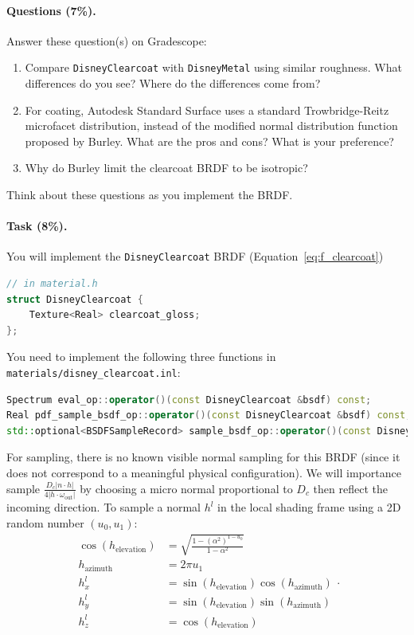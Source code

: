 \paragraph{Questions (7\%).} Answer these question(s) on Gradescope:
\begin{enumerate}
    \item Compare \lstinline{DisneyClearcoat} with \lstinline{DisneyMetal} using similar roughness. What differences do you see? Where do the differences come from?
    \item For coating, Autodesk Standard Surface uses a standard Trowbridge-Reitz microfacet distribution, instead of the modified normal distribution function proposed by Burley. What are the pros and cons? What is your preference? 
    \item Why do Burley limit the clearcoat BRDF to be isotropic?
\end{enumerate}
Think about these questions as you implement the BRDF.

\paragraph{Task (8\%).} You will implement the \lstinline{DisneyClearcoat} BRDF (Equation~\ref{eq:f_clearcoat})
\begin{lstlisting}[language=c++]
// in material.h
struct DisneyClearcoat {
    Texture<Real> clearcoat_gloss;
};
\end{lstlisting}

You need to implement the following three functions in \lstinline{materials/disney_clearcoat.inl}:
\begin{lstlisting}[language=c++]
Spectrum eval_op::operator()(const DisneyClearcoat &bsdf) const;
Real pdf_sample_bsdf_op::operator()(const DisneyClearcoat &bsdf) const;
std::optional<BSDFSampleRecord> sample_bsdf_op::operator()(const DisneyClearcoat &bsdf) const;
\end{lstlisting}

For sampling, there is no known visible normal sampling for this BRDF (since it does not correspond to a meaningful physical configuration). We will importance sample $\frac{D_c |n \cdot h|}{4 |h \cdot \omega_{\text{out}}|}$ by choosing a micro normal proportional to $D_c$ then reflect the incoming direction. To sample a normal $h^{l}$ in the local shading frame using a 2D random number $(u_0, u_1)$:
\begin{equation}
\begin{aligned}
\cos(h_{\text{elevation}}) &= \sqrt{\frac{1 - \left(\alpha^2\right)^{1 - u_0}}{1 - \alpha^2}} \\
h_{\text{azimuth}} &= 2 \pi u_1 \\
h^l_x &= \sin(h_{\text{elevation}}) \cos(h_{\text{azimuth}}) \\
h^l_y &= \sin(h_{\text{elevation}}) \sin(h_{\text{azimuth}}) \\
h^l_z &= \cos(h_{\text{elevation}})
\end{aligned}.
\end{equation}

